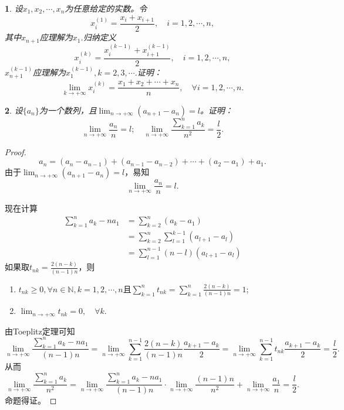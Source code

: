 \documentclass[utf8]{book}
\newtheorem{example}{}[section]             %
\begin{document}
\begin{example}
设$x_1,x_2,\cdots, x_n$为任意给定的实数。令
$$x_i^{(1)}=\frac{x_i+x_{i+1}}{2}, \quad i=1,2,\cdots, n,$$
其中$x_{n+1}$应理解为$x_1$.归纳定义
$$x_i^{(k)}=\frac{x_i^{(k-1)}+x_{i+1}^{(k-1)}}{2}, \quad i=1,2,\cdots, n,$$
$x^{(k-1)}_{n+1}$应理解为$x_1^{(k-1)},k=2,3,\cdots$.证明：
$$\displaystyle\lim_{k\to +\infty}x_i^{(k)}=\frac{x_1+x_2+\cdots+x_n}{n}, \quad \forall i = 1,2,\cdots,n.$$
\end{example}

\begin{example}
设$\{a_n\}$为一个数列，且$\displaystyle\lim_{n\to +\infty}(a_{n+1}-a_n) = l$。证明：$$\displaystyle\lim_{n\to +\infty}\frac{a_n}{n} = l; \quad \displaystyle\lim_{n\to +\infty}\frac{\displaystyle\sum_{k=1}^na_k}{n^2} =\frac{l}{2}.$$
\end{example}
\begin{proof}
$$a_n = (a_n - a_{n-1}) + (a_{n-1}-a_{n-2})+\cdots + (a_2 - a_1) + a_1.$$
由于$\displaystyle\lim_{n\to +\infty}(a_{n+1}-a_n) = l$，易知
$$\displaystyle\lim_{n\to +\infty}\frac{a_n}{n} = l.$$

现在计算
\begin{equation*}
\begin{split}
\displaystyle\sum_{k=1}^na_k - na_1 &= \displaystyle\sum_{k=2}^{n}(a_k - a_1)\\
&=\displaystyle\sum_{k=2}^{n}\displaystyle\sum_{l=1}^{k-1}(a_{l+1}-a_l)\\
&=\displaystyle\sum_{l=1}^{n-1}(n-l)(a_{l+1}-a_l)
\end{split}
\end{equation*}
如果取$t_{nk}=\displaystyle\frac{2(n-k)}{(n-1)n}$，则
\renewcommand\labelenumi{\normalfont(\theenumi)}
\begin{enumerate}
\item $t_{nk} \geq 0, \forall n\in\mathbb{N}, k=1,2,\cdots, n$且$\displaystyle\sum_{k=1}^{n}t_{nk} = \displaystyle\sum_{k=1}^{n}\frac{2(n-k)}{(n-1)n}=1$;
\item $\displaystyle\lim_{n\to +\infty}t_{nk} = 0, \quad\forall k$.
\end{enumerate}
由Toeplitz定理可知
$$\displaystyle\lim_{n\to +\infty}\frac{\displaystyle\sum_{k=1}^na_k - na_1}{(n-1)n}=\displaystyle\lim_{n\to +\infty}\displaystyle\sum_{k=1}^{n-1}\frac{2(n-k)}{(n-1)n}\frac{a_{k+1}-a_k}{2}=\displaystyle\lim_{n\to +\infty}\displaystyle\sum_{k=1}^{n-1}t_{nk}\frac{a_{k+1}-a_k}{2}=\frac{l}{2}.$$
从而
$$\displaystyle\lim_{n\to +\infty}\frac{\displaystyle\sum_{k=1}^na_k}{n^2}=\displaystyle\lim_{n\to +\infty}\frac{\displaystyle\sum_{k=1}^na_k - na_1}{(n-1)n}\cdot\displaystyle\lim_{n\to +\infty}\frac{(n-1)n}{n^2}+\displaystyle\lim_{n\to +\infty}\frac{a_1}{n}=\frac{l}{2}.$$
命题得证。
\end{proof}
\end{document}
